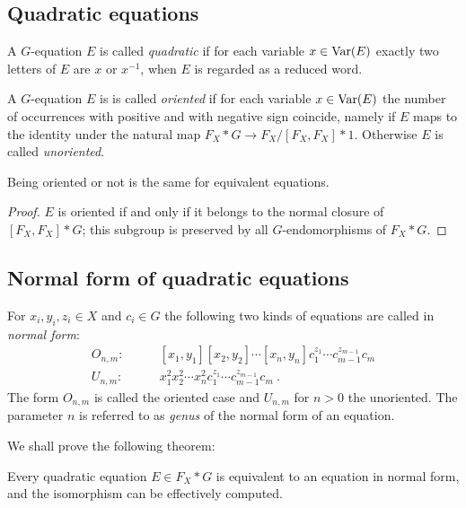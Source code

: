 \documentclass[a4paper,11pt]{amsart}
\begin{document}
\subsection{Quadratic equations}
A $G$-equation $E$ is called \emph{quadratic} if for each variable
$x\in \textup{Var}(E)$ exactly two letters of $E$ are $x$ or $x^{-1}$, when
$E$ is regarded as a reduced word.

A $G$-equation $E$ is is called \emph{oriented} if for each variable
$x\in \textup{Var}(E)$ the number of occurrences with positive and with
negative sign coincide, namely if $E$ maps to the identity under the
natural map $F_X*G\to F_X/[F_X,F_X]*1$.  Otherwise $E$ is called
\emph{unoriented}.
\begin{lem}
 Being oriented or not is the same for equivalent equations.
\end{lem}
\begin{proof}
  $E$ is oriented if and only if it belongs to the normal closure of
  $[F_X,F_X]*G$; this subgroup is preserved by all $G$-endomorphisms
  of $F_X*G$.
\end{proof}

\subsection{Normal form of quadratic equations} \label{sec:normal_form}
\begin{defi}
  For $x_i,y_i,z_i \in X$ and $c_i \in G$ the following two kinds of
  equations are called in \emph{normal form}:
 \begin{align}
  O_{n,m}:\qquad & [x_1,y_1][x_2,y_2]\cdots[x_n,y_n]c_1^{z_1}\cdots c_{m-1}^{z_{m-1}}c_m  \\
   U_{n,m}:\qquad & x_1^2x_2^2\cdots x_n^2 c_1^{z_1}\cdots c_{m-1}^{z_{m-1}}c_m\ .
 \end{align} 
 The form $O_{n,m}$ is called the oriented case and $U_{n,m}$ for
 $n>0$ the unoriented.  The parameter $n$ is referred to as
 \emph{genus} of the normal form of an equation.
\end{defi}

We shall prove the following theorem:
\begin{thm} \label{Thm:equationNormalForm}
  Every quadratic equation $E \in F_X*G$ is equivalent to an equation
  in normal form, and the isomorphism can be effectively computed.
\end{thm}
\end{document}
